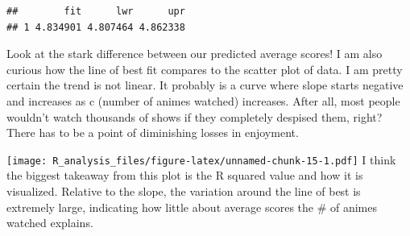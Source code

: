 \documentclass[
]{article}
\newenvironment{Shaded}{\begin{snugshade}}{\end{snugshade}}
\newcommand{\AttributeTok}[1]{\textcolor[rgb]{0.77,0.63,0.00}{#1}}
\newcommand{\CommentTok}[1]{\textcolor[rgb]{0.56,0.35,0.01}{\textit{#1}}}
\newcommand{\DecValTok}[1]{\textcolor[rgb]{0.00,0.00,0.81}{#1}}
\newcommand{\FunctionTok}[1]{\textcolor[rgb]{0.00,0.00,0.00}{#1}}
\newcommand{\NormalTok}[1]{#1}
\newcommand{\OtherTok}[1]{\textcolor[rgb]{0.56,0.35,0.01}{#1}}
\newcommand{\SpecialCharTok}[1]{\textcolor[rgb]{0.00,0.00,0.00}{#1}}
\newcommand{\StringTok}[1]{\textcolor[rgb]{0.31,0.60,0.02}{#1}}
\begin{document}
\begin{verbatim}
##        fit      lwr      upr
## 1 4.834901 4.807464 4.862338
\end{verbatim}

Look at the stark difference between our predicted average scores! I am
also curious how the line of best fit compares to the scatter plot of
data. I am pretty certain the trend is not linear. It probably is a
curve where slope starts negative and increases as c (number of animes
watched) increases. After all, most people wouldn't watch thousands of
shows if they completely despised them, right? There has to be a point
of diminishing losses in enjoyment.

\begin{Shaded}
\end{Shaded}

\texttt{[image: R\_analysis\_files/figure-latex/unnamed-chunk-15-1.pdf]} I
think the biggest takeaway from this plot is the R squared value and how
it is visualized. Relative to the slope, the variation around the line
of best is extremely large, indicating how little about average scores
the \# of animes watched explains.

\begin{Shaded}
\end{Shaded}
\end{document}
